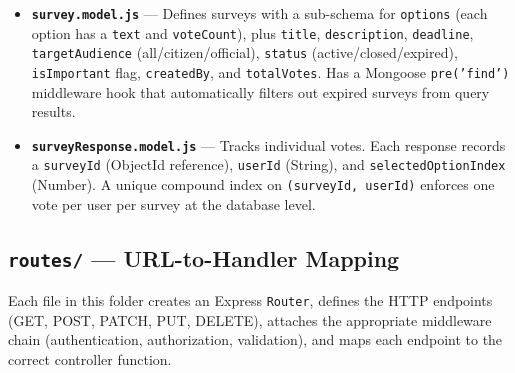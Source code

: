 \documentclass[12pt,a4paper]{article}
\begin{document}
\begin{itemize}[leftmargin=1cm]
  \item \textbf{\texttt{survey.model.js}} --- Defines surveys with a sub-schema for \texttt{options} (each option has a \texttt{text} and \texttt{voteCount}), plus \texttt{title}, \texttt{description}, \texttt{deadline}, \texttt{targetAudience} (all/citizen/official), \texttt{status} (active/closed/expired), \texttt{isImportant} flag, \texttt{createdBy}, and \texttt{totalVotes}. Has a Mongoose \texttt{pre('find')} middleware hook that automatically filters out expired surveys from query results.

  \item \textbf{\texttt{surveyResponse.model.js}} --- Tracks individual votes. Each response records a \texttt{surveyId} (ObjectId reference), \texttt{userId} (String), and \texttt{selectedOptionIndex} (Number). A unique compound index on \texttt{(surveyId, userId)} enforces one vote per user per survey at the database level.
\end{itemize}

\subsection{\texttt{routes/} --- URL-to-Handler Mapping}

Each file in this folder creates an Express \texttt{Router}, defines the HTTP endpoints (GET, POST, PATCH, PUT, DELETE), attaches the appropriate middleware chain (authentication, authorization, validation), and maps each endpoint to the correct controller function.
\end{document}

